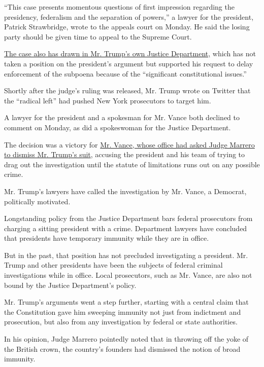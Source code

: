 ``This case presents momentous questions of first impression regarding
the presidency, federalism and the separation of powers,'' a lawyer for
the president, Patrick Strawbridge, wrote to the appeals court on
Monday. He said the losing party should be given time to appeal to the
Supreme Court.

\href{https://www.nytimes.com/2019/10/02/nyregion/trump-taxes-lawsuit.html}{The
case also has drawn in Mr. Trump's own Justice Department,} which has
not taken a position on the president's argument but supported his
request to delay enforcement of the subpoena because of the
``significant constitutional issues.''

Shortly after the judge's ruling was released, Mr. Trump wrote on
Twitter that the ``radical left'' had pushed New York prosecutors to
target him.

A lawyer for the president and a spokesman for Mr. Vance both declined
to comment on Monday, as did a spokeswoman for the Justice Department.

The decision was a victory for
\href{https://www.nytimes.com/2019/09/23/nyregion/trump-tax-returns-lawsuit.html?module=inline}{Mr.
Vance, whose office had asked Judge Marrero to dismiss Mr. Trump's
suit}, accusing the president and his team of trying to drag out the
investigation until the statute of limitations runs out on any possible
crime.

Mr. Trump's lawyers have called the investigation by Mr. Vance, a
Democrat, politically motivated.

Longstanding policy from the Justice Department bars federal prosecutors
from charging a sitting president with a crime. Department lawyers have
concluded that presidents have temporary immunity while they are in
office.

But in the past, that position has not precluded investigating a
president. Mr. Trump and other presidents have been the subjects of
federal criminal investigations while in office. Local prosecutors, such
as Mr. Vance, are also not bound by the Justice Department's policy.

Mr. Trump's arguments went a step further, starting with a central claim
that the Constitution gave him sweeping immunity not just from
indictment and prosecution, but also from any investigation by federal
or state authorities.

In his opinion, Judge Marrero pointedly noted that in throwing off the
yoke of the British crown, the country's founders had dismissed the
notion of broad immunity.

